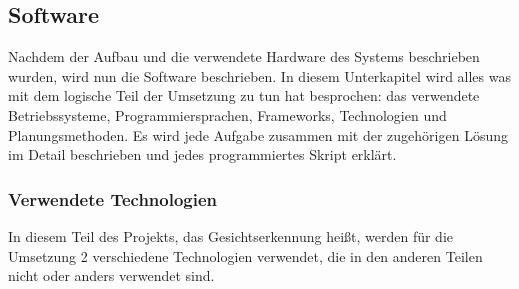 \subsection{Software}
Nachdem der Aufbau und die verwendete Hardware des Systems beschrieben wurden, wird nun die Software beschrieben. In diesem Unterkapitel wird alles was mit dem logische Teil der Umsetzung zu tun hat besprochen: das verwendete Betriebssysteme, Programmiersprachen, Frameworks, Technologien und Planungsmethoden. Es wird jede Aufgabe zusammen mit der zugehörigen Lösung im Detail beschrieben und jedes programmiertes Skript erklärt.
\subsubsection{Verwendete Technologien}
In diesem Teil des Projekts, das Gesichtserkennung heißt, werden für die Umsetzung 2 verschiedene Technologien verwendet, die in den anderen Teilen nicht oder anders verwendet sind.

